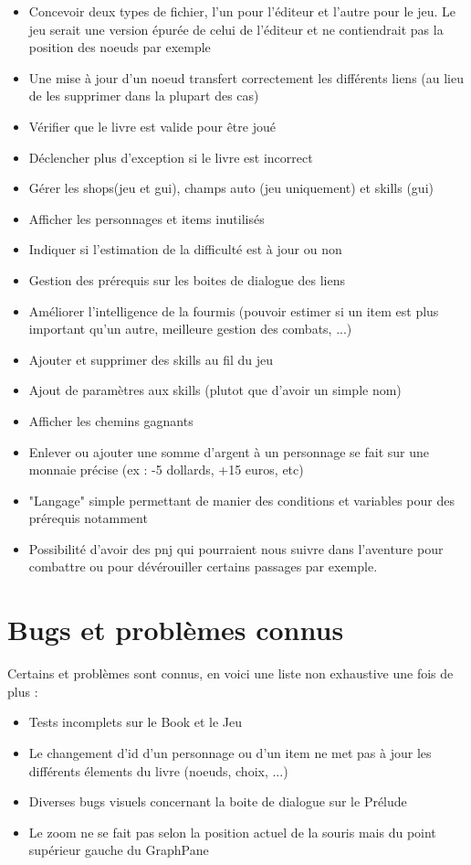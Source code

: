 		\begin{itemize}
			\item{Concevoir deux types de fichier, l'un pour l'éditeur et l'autre pour le jeu. Le jeu serait une version épurée de celui de l'éditeur et ne contiendrait pas la position des noeuds par exemple}
			\item{Une mise à jour d'un noeud transfert correctement les différents liens (au lieu de les supprimer dans la plupart des cas)}
			\item{Vérifier que le livre est valide pour être joué}
			\item{Déclencher plus d'exception si le livre est incorrect}
			\item{Gérer les shops(jeu et gui), champs auto (jeu uniquement) et skills (gui)}
			\item{Afficher les personnages et items inutilisés}
			\item{Indiquer si l'estimation de la difficulté est à jour ou non}
			\item{Gestion des prérequis sur les boites de dialogue des liens}
			\item{Améliorer l'intelligence de la fourmis (pouvoir estimer si un item est plus important qu'un autre, meilleure gestion des combats, ...)}
			\item{Ajouter et supprimer des skills au fil du jeu}
			\item{Ajout de paramètres aux skills (plutot que d'avoir un simple nom)}
			\item{Afficher les chemins gagnants}
			\item{Enlever ou ajouter une somme d'argent à un personnage se fait sur une monnaie précise (ex : -5 dollards, +15 euros, etc)}
			\item{"Langage" simple permettant de manier des conditions et variables pour des prérequis notamment}
			\item{Possibilité d'avoir des pnj qui pourraient nous suivre dans l'aventure pour combattre ou pour dévérouiller certains passages par exemple.}
		\end{itemize}

	\section{Bugs et problèmes connus}

		Certains et problèmes sont connus, en voici une liste non exhaustive une fois de plus :

		\begin{itemize}
			\item{Tests incomplets sur le Book et le Jeu}
			\item{Le changement d'id d'un personnage ou d'un item ne met pas à jour les différents élements du livre (noeuds, choix, ...)}
			\item{Diverses bugs visuels concernant la boite de dialogue sur le Prélude}
			\item{Le zoom ne se fait pas selon la position actuel de la souris mais du point supérieur gauche du GraphPane}
		\end{itemize}
